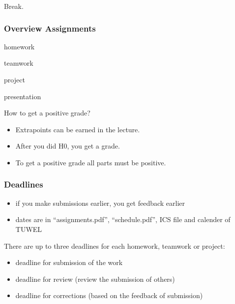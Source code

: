 \begin{assignment}
	\begin{task}
	Break.
	\end{task}
\end{assignment}

\begin{frame}
	\frametitle{Overview Assignments}
	\begin{description}[<+-| alert@+>]
	\item[30\,\%:] homework
	\item[30\,\%:] teamwork
	\item[40\,\%:] project
	\item[0\,\%:] presentation
	\end{description}

	\pause

	\begin{question}
	How to get a positive grade?
	\end{question}

	\pause

	\begin{itemize}[<+-| alert@+>]
	\item Extrapoints can be earned in the lecture.
	\item After you did H0, you get a grade.
	\item To get a positive grade all parts must be positive.
	\end{itemize}
\end{frame}

\begin{frame}
	\frametitle{Deadlines}

	\begin{itemize}[<+-| alert@+>]
	\item if you make submissions earlier, you get feedback earlier
	\item dates are in ``assignments.pdf'', ``schedule.pdf'', ICS file and calender of TUWEL
	\end{itemize}

	\vspace{1em}

	There are up to three deadlines for each homework, teamwork or project:

	\begin{itemize}[<+-| alert@+>]
	\item deadline for submission of the work
	\item deadline for review (review the submission of others)
	\item deadline for corrections (based on the feedback of submission)
	\end{itemize}
\end{frame}

